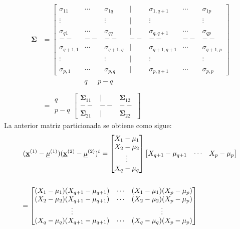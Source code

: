 \documentclass[
]{book}
\theoremstyle{definition}
\theoremstyle{definition}
\theoremstyle{definition}
\theoremstyle{definition}
\theoremstyle{remark}
\begin{document}
\begin{align*}
\mathbf{\Sigma}&=\begin{bmatrix}
\sigma_{11} & \cdots & \sigma_{1q} & | & \sigma
_{1,q+1} & \cdots & \sigma_{1p} \\
\vdots & & \vdots & | & \vdots & & \vdots \\
\sigma_{q1} & \cdots & \sigma_{qq} & | & \sigma_{q,q+1} & \cdots & \sigma_{qp} \\
-- & -- & -- & -- & -- & -- & -- \\
\sigma_{q+1,1} & \cdots & \sigma_{q+1,q} & | & \sigma_{q+1,q+1} & \cdots & \sigma_{q+1,p} \\
\vdots & & \vdots & | & \vdots & & \vdots \\
\sigma_{p,1} & \cdots & \sigma_{p,q} & | & \sigma_{p,q+1} & \cdots & \sigma_{p,p}
\end{bmatrix}\\
& \hspace{2cm}
\begin{array}{ccc}
& q & \ \ \ p-q
\end{array}\\ \\
&= \begin{array}{c}
q \\ \\ p-q
\end{array}
\begin{bmatrix}
\mathbf{\Sigma}_{11} & | & \mathbf{\Sigma}_{12} \\
-- & -- & -- \\
\mathbf{\Sigma}_{21} & | & \mathbf{\Sigma}_{22}
\end{bmatrix}
\end{align*}
La anterior matriz particionada se obtiene como sigue:
\begin{align*}
(\underline{\mathbf{x}}^{(1)}-\underline{\mu}^{(1)})(\underline{\mathbf{x}}^{(2)}-\underline{\mu}^{(2)})^t&=
  \begin{bmatrix}
X_1-\mu_1 \\ X_2-\mu_2 \\ \vdots \\ X_q-\mu_q
\end{bmatrix}\begin{bmatrix}
X_{q+1}-\mu_{q+1} &  \cdots & X_p-\mu_p
\end{bmatrix}\\ \\
&\hspace{-4cm}=\begin{bmatrix}
(X_1-\mu_1)(X_{q+1}-\mu_{q+1}) & \cdots & (X_1-\mu_1)(X_p-\mu_p)\\
(X_2-\mu_2)(X_{q+1}-\mu_{q+1}) & \cdots & (X_2-\mu_2)(X_p-\mu_p)\\
\vdots & & \vdots \\
(X_q-\mu_q)(X_{q+1}-\mu_{q+1}) & \cdots & (X_q-\mu_q)(X_p-\mu_p)
\end{bmatrix}
\end{align*}
\end{document}
